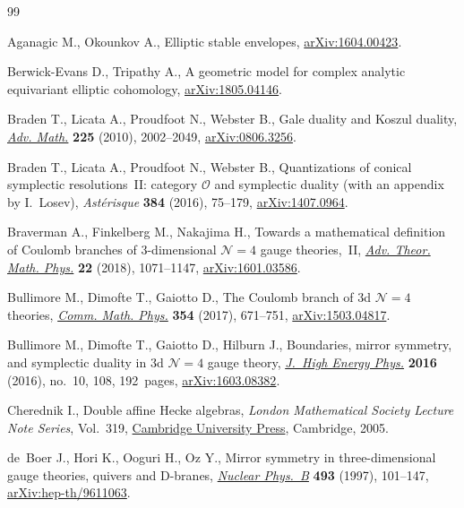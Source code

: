 \begin{thebibliography}{99}
\footnotesize\itemsep=0pt

Aganagic M., Okounkov A., Elliptic stable envelopes, \href{https://arxiv.org/abs/1604.00423}{arXiv:1604.00423}.

Berwick-Evans D., Tripathy A., A geometric model for complex analytic
 equivariant elliptic cohomology, \href{https://arxiv.org/abs/1805.04146}{arXiv:1805.04146}.

Braden T., Licata A., Proudfoot N., Webster B., Gale duality and {K}oszul
 duality, \href{https://doi.org/10.1016/j.aim.2010.04.011}{\textit{Adv. Math.}} \textbf{225} (2010), 2002--2049,
 \href{https://arxiv.org/abs/0806.3256}{arXiv:0806.3256}.

Braden T., Licata A., Proudfoot N., Webster B., Quantizations of conical
 symplectic resolutions~{II}: category {$\mathcal O$} and symplectic duality
 (with an appendix by {I}.~{L}osev), \textit{Ast\'{e}risque} \textbf{384}
 (2016), 75--179, \href{https://arxiv.org/abs/1407.0964}{arXiv:1407.0964}.

Braverman A., Finkelberg M., Nakajima H., Towards a mathematical definition of
 {C}oulomb branches of 3-dimensional {${\mathcal N}=4$} gauge theories,~{II},
 \href{https://doi.org/10.4310/ATMP.2018.v22.n5.a1}{\textit{Adv. Theor. Math. Phys.}} \textbf{22} (2018), 1071--1147,
 \href{https://arxiv.org/abs/1601.03586}{arXiv:1601.03586}.

Bullimore M., Dimofte T., Gaiotto D., The {C}oulomb branch of 3d {${\mathcal
 N}=4$} theories, \href{https://doi.org/10.1007/s00220-017-2903-0}{\textit{Comm. Math. Phys.}} \textbf{354} (2017), 671--751,
 \href{https://arxiv.org/abs/1503.04817}{arXiv:1503.04817}.

Bullimore M., Dimofte T., Gaiotto D., Hilburn J., Boundaries, mirror symmetry,
 and symplectic duality in 3d {${\mathcal N}=4$} gauge theory, \href{https://doi.org/10.1007/JHEP10(2016)108}{\textit{J.~High
 Energy Phys.}} \textbf{2016} (2016), no.~10, 108, 192~pages,
 \href{https://arxiv.org/abs/1603.08382}{arXiv:1603.08382}.

Cherednik I., Double affine {H}ecke algebras, \textit{London Mathematical
 Society Lecture Note Series}, Vol.~319, \href{https://doi.org/10.1017/CBO9780511546501}{Cambridge University Press},
 Cambridge, 2005.

de~Boer J., Hori K., Ooguri H., Oz Y., Mirror symmetry in three-dimensional
 gauge theories, quivers and {D}-branes, \href{https://doi.org/10.1016/S0550-3213(97)00125-9}{\textit{Nuclear Phys.~B}} \textbf{493}
 (1997), 101--147, \href{https://arxiv.org/abs/hep-th/9611063}{arXiv:hep-th/9611063}.


\end{thebibliography}
